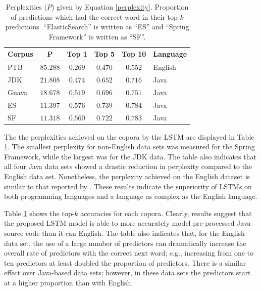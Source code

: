 \documentclass[runningheads,a4paper]{llncs}
\newcommand{\tabhorzspacing}{0.5em}
\newcommand{\tabvertspacing}{1.1}
\begin{document}
\begin{table}[t]
    \caption{Perplexities ($P$) given by Equation \ref{perplexity}.
    Proportion of predictions which had the correct
    word in their top-$k$ predictions.
    ``ElasticSearch'' is written as ``ES'' and ``Spring
    Framework'' is written as ``SF''.}
    \label{topk-table}
    \vskip 0.15in
    \begin{center}
    \setlength{\tabcolsep}{\tabhorzspacing}
    {\renewcommand{\arraystretch}{\tabvertspacing}
    \begin{tabular}{lccccl}
    \hline
    Corpus & P & Top 1 & Top 5 & Top 10 & Language \\
    \hline
    PTB   & $85.288$ & $0.269$ & $0.470$ & $0.552$ & English \\
    JDK   & $21.808$ & $0.474$ & $0.652$ & $0.716$ & Java \\
    Guava & $18.678$ & $0.519$ & $0.696$ & $0.751$ & Java \\
    ES    & $11.397$ & $0.576$ & $0.739$ & $0.784$ & Java \\
    SF    & $11.318$ & $0.560$ & $0.722$ & $0.783$ & Java \\
    \hline
    \end{tabular}}
    \end{center}
    \vskip -0.1in
\end{table}

The the perplexities achieved on the copora by the LSTM are displayed in
Table \ref{topk-table}. The smallest perplexity for non-English data sets 
was measured for the Spring Framework, while the largest was for the JDK data. 
The table also indicates that all four Java data sets showed a drastic 
reduction in perplexity compared to the English data set. Nonetheless, the 
perplexity achieved on the English dataset is similar to that reported by 
\citet{LSTMArticle}. These results indicate the superiority of LSTMs on both
programming languages and a language as complex as the English language.

Table \ref{topk-table} shows the top-$k$ accuracies for each copora.
Clearly, results suggest that the proposed LSTM model is able to more
accurately model pre-processed Java source code than it can English. The table
also indicates that, for the English data set, the use of a large number of
predictors can dramatically increase the overall rate of predictors with the
correct next word; e.g., increasing from one to ten predictors at least doubled
the proportion of predictors. There is a similar effect over Java-based data
sets; however, in these data sets the predictors start at a higher proportion
than with English.
\end{document}
